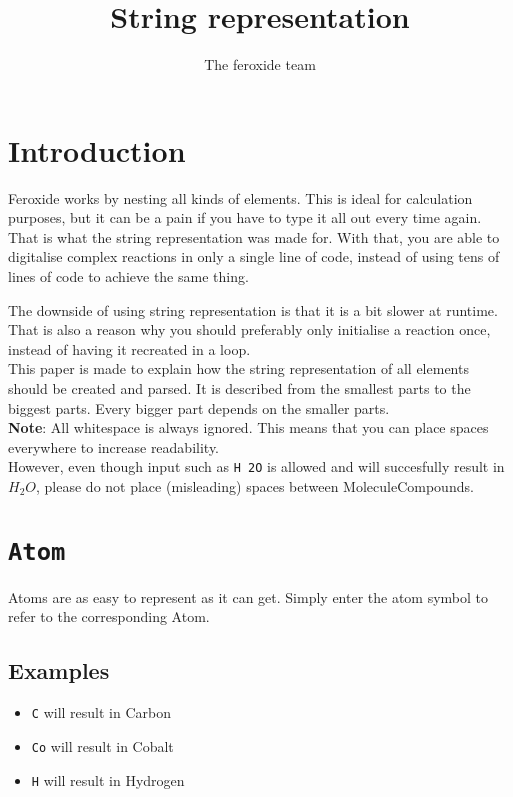 \documentclass[11pt]{article}
\title{String representation}
\author{The feroxide team}
\def\code#1{\texttt{#1}}
\begin{document}
\maketitle

\section{Introduction}
Feroxide works by nesting all kinds of elements. This is ideal for calculation
purposes, but it can be a pain if you have to type it all out every time again.
That is what the string representation was made for. With that, you are able
to digitalise complex reactions in only a single line of code, instead of
using tens of lines of code to achieve the same thing.

The downside of using string representation is that it is a bit slower at
runtime. That is also a reason why you should preferably only initialise
a reaction once, instead of having it recreated in a loop. \\

This paper is made to explain how the string representation of all
elements should be created and parsed. It is described from the smallest
parts to the biggest parts. Every bigger part depends on the smaller parts. \\

\textbf{Note}: All whitespace is always ignored. This means that you can place spaces
everywhere to increase readability. \\
However, even though input such as \code{H  2O} is allowed and will succesfully result in $H_2O$, please
do not place (misleading) spaces between MoleculeCompounds.

\newpage

\section{\code{Atom}}
Atoms are as easy to represent as it can get. Simply enter the atom symbol to refer to the corresponding Atom.

\subsection{Examples}
\begin{itemize}
  \item{\code{C} will result in Carbon}
  \item{\code{Co} will result in Cobalt}
  \item{\code{H} will result in Hydrogen}
\end{itemize}
\end{document}
